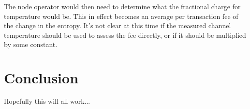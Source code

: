 \documentclass[review,12pt]{elsarticle}
\begin{document}
The node operator would then need to determine what the fractional charge for temperature would be.
This in effect becomes an average per transaction fee of the change in the entropy.
It's not clear at this time if the measured channel temperature should be used to assess the fee directly, or if it should be multiplied by some constant.

\section{Conclusion}
Hopefully this will all work...




\end{document}
